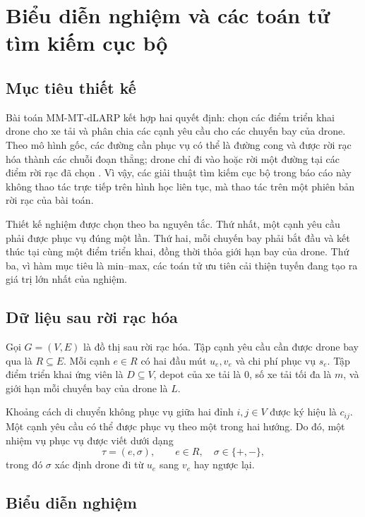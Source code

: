\chapter{Biểu diễn nghiệm và các toán tử tìm kiếm cục bộ}
\label{chap:bieu-dien-nghiem}

\section{Mục tiêu thiết kế}

Bài toán MM-MT-dLARP kết hợp hai quyết định: chọn các điểm triển khai drone cho xe tải và phân chia các cạnh yêu cầu cho các chuyến bay của drone. Theo mô hình gốc, các đường cần phục vụ có thể là đường cong và được rời rạc hóa thành các chuỗi đoạn thẳng; drone chỉ đi vào hoặc rời một đường tại các điểm rời rạc đã chọn \cite{corberan2025mmdlarp}. Vì vậy, các giải thuật tìm kiếm cục bộ trong báo cáo này không thao tác trực tiếp trên hình học liên tục, mà thao tác trên một phiên bản rời rạc của bài toán.

Thiết kế nghiệm được chọn theo ba nguyên tắc. Thứ nhất, một cạnh yêu cầu phải được phục vụ đúng một lần. Thứ hai, mỗi chuyến bay phải bắt đầu và kết thúc tại cùng một điểm triển khai, đồng thời thỏa giới hạn bay của drone. Thứ ba, vì hàm mục tiêu là min--max, các toán tử ưu tiên cải thiện tuyến đang tạo ra giá trị lớn nhất của nghiệm.

\section{Dữ liệu sau rời rạc hóa}

Gọi \(G=(V,E)\) là đồ thị sau rời rạc hóa. Tập cạnh yêu cầu cần được drone bay qua là \(R\subseteq E\). Mỗi cạnh \(e\in R\) có hai đầu mút \(u_e,v_e\) và chi phí phục vụ \(s_e\). Tập điểm triển khai ứng viên là \(D\subseteq V\), depot của xe tải là \(0\), số xe tải tối đa là \(m\), và giới hạn mỗi chuyến bay của drone là \(L\).

Khoảng cách di chuyển không phục vụ giữa hai đỉnh \(i,j\in V\) được ký hiệu là \(c_{ij}\). Một cạnh yêu cầu có thể được phục vụ theo một trong hai hướng. Do đó, một nhiệm vụ phục vụ được viết dưới dạng
\[
\tau=(e,\sigma),\qquad e\in R,\quad \sigma\in\{+,-\},
\]
trong đó \(\sigma\) xác định drone đi từ \(u_e\) sang \(v_e\) hay ngược lại.

\section{Biểu diễn nghiệm}

